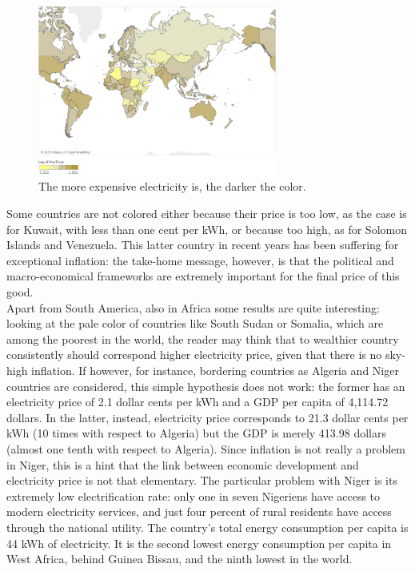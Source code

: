 \documentclass{book}
\begin{document}
\bigskip
\begin{figure}[H]
\begin{center}
\captionsetup{justification=centering}
\includegraphics[width=0.7\textwidth]{Images/world2020.png}
\caption{The more expensive electricity is, the darker the color. }
\end{center}
\end{figure}
\bigskip

Some countries are not colored either because their price is too low, as the case is for Kuwait, with less than one cent per kWh, or because too high, as for Solomon Islands and Venezuela. This latter country in recent years has been suffering for exceptional inflation: the take-home message, however, is that the political and macro-economical frameworks are extremely important for the final price of this good.\\

Apart from South America, also in Africa some results are quite interesting: looking at the pale color of countries like South Sudan or Somalia, which are among the poorest in the world, the reader may think that to wealthier country consistently should correspond higher electricity price, given that there is no sky-high inflation. If however, for instance, bordering countries as Algeria and Niger countries are considered, this simple hypothesis does not work: the former has an electricity price of 2.1 dollar cents per kWh and a GDP per capita of 4,114.72 dollars. In the latter, instead, electricity price corresponds to 21.3 dollar cents per kWh (10 times with respect to Algeria) but the GDP is merely 413.98 dollars (almost one tenth with respect to Algeria). Since inflation is not really a problem in Niger, this is a hint that the link between economic development and electricity price is not that elementary. The particular problem with Niger is its extremely low electrification rate: only one in seven Nigeriens have access to modern electricity services, and just four percent of rural residents have access through the national utility. The country's total energy consumption per capita is 44 kWh of electricity. It is the second lowest energy consumption per capita in West Africa, behind Guinea Bissau, and the ninth lowest in the world. 
\end{document}
